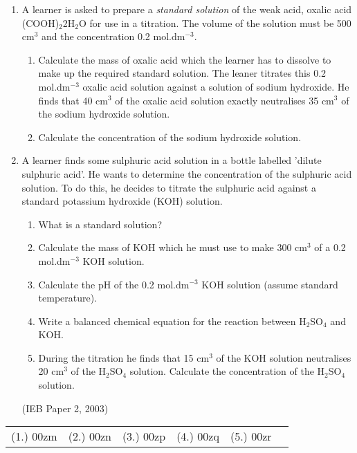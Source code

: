 {\begin{enumerate}
\item{A learner is asked to prepare a \textit{standard solution} of the weak acid, oxalic acid (COOH)$_{2}$2H$_{2}$O for use in a titration. The volume of the solution must be 500 cm$^{3}$ and the concentration 0.2 mol.dm$^{-3}$.
\begin{enumerate}
\item{Calculate the mass of oxalic acid which the learner has to dissolve to make up the required standard solution.}
The leaner titrates this 0.2 mol.dm$^{-3}$ oxalic acid solution against a solution of sodium hydroxide. He finds that 40 cm$^{3}$ of the oxalic acid solution exactly neutralises 35 cm$^{3}$ of the sodium hydroxide solution.
\item{Calculate the concentration of the sodium hydroxide solution.}
\end{enumerate}
}

\item{A learner finds some sulphuric acid solution in a bottle labelled 'dilute sulphuric acid'. He wants to determine the concentration of the sulphuric acid solution. To do this, he decides to titrate the sulphuric acid against a standard potassium hydroxide (KOH) solution.

\begin{enumerate}
\item{What is a standard solution?}
\item{Calculate the mass of KOH which he must use to make 300 cm$^{3}$ of a 0.2 mol.dm$^{-3}$ KOH solution.}
\item{Calculate the pH of the 0.2 mol.dm$^{-3}$ KOH solution (assume standard temperature).}
\item{Write a balanced chemical equation for the reaction between H$_{2}$SO$_{4}$ and KOH.}
\item{During the titration he finds that 15 cm$^{3}$ of the KOH solution neutralises 20 cm$^{3}$ of the H$_{2}$SO$_{4}$ solution. Calculate the concentration of the H$_{2}$SO$_{4}$ solution.}
\end{enumerate}
(IEB Paper 2, 2003)
}

\end{enumerate}
\practiceinfo

\begin{tabular}[h]{cccccc}
(1.) 00zm & (2.) 00zn & (3.) 00zp & (4.) 00zq & (5.) 00zr & 
 \end{tabular}
}







